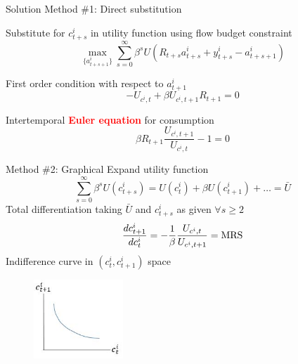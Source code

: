 
\begin{frame}{Solution Method \#1: Direct substitution}

Substitute for $c_{t+s}^{i}$ in utility function using flow budget constraint%
\begin{equation*}
\underset{\{a_{t+s+1}^{i}\}}{\max }\underset{s=0}{\overset{\infty }{\sum }}\beta ^{s}U(R_{t+s}a_{t+s}^{i}+y_{t+s}^{i}-a_{t+s+1}^{i})
\end{equation*}

First order condition with respect to $a_{t+1}^{i}$
\begin{equation*}
-U_{c^{i},t}+\beta U_{c^{i},t+1}R_{t+1}=0
\end{equation*}

Intertemporal \textcolor{red}{\textbf{Euler equation}} for consumption
\begin{equation*}
\beta R_{t+1}\frac{U_{c^{i},t+1}}{U_{c^{i},t}}-1=0
\end{equation*}

\end{frame}


\begin{frame}{Method \#2: Graphical}
Expand utility function
\begin{equation*}
\underset{s=0}{\overset{\infty }{\sum }}\beta^{s}U(c_{t+s}^{i})=U(c_{t}^{i})+\beta U(c_{t+1}^{i})+\ldots =\bar{U}
\end{equation*}
Total differentiation taking $\bar{U}$ and $c_{t+s}^{i}$ as given $\forall s\geq 2$ 
\begin{equation*}
\frac{dc_{t+1}^{i}}{dc_{t}^{i}}=-\frac{1}{\beta }\frac{U_{c^{i},t}}{%
U_{c^{i},t+1}}=\text{MRS}
\end{equation*}
Indifference curve in $(c_{t}^{i},c_{t+1}^{i})$ space
\begin{figure}
\centering
\label{fig:intertemp_c_icurve}
\includegraphics[width=0.3\textwidth]{Figures/intertemp_c_icurve.JPG}
\end{figure}
\end{frame}

